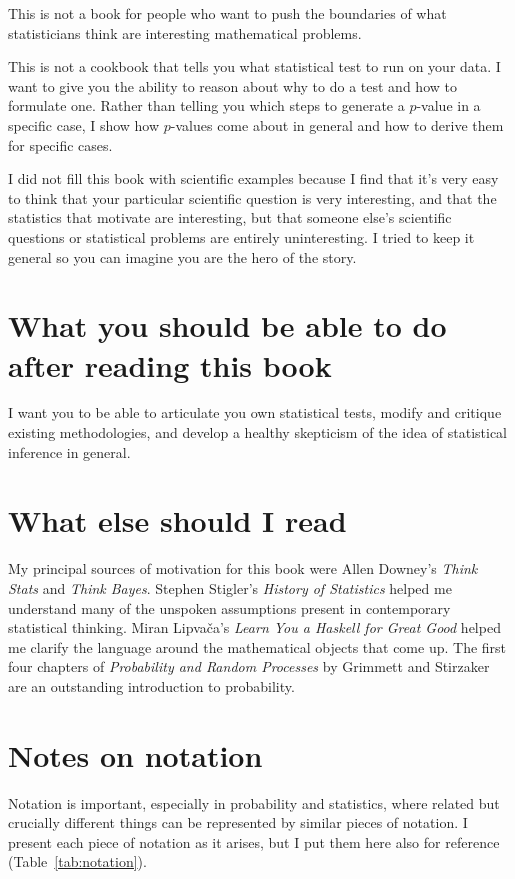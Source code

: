This is not a book for people who want to push the boundaries of what
statisticians think are interesting mathematical problems.

This is not a cookbook that tells you what statistical test to run on your
data. I want to give you the ability to reason about why to do a test and
how to formulate one. Rather than telling you which steps to generate a
$p$-value in a specific case, I show how $p$-values come about in general and
how to derive them for specific cases.

I did not fill this book with scientific examples because I find that it's
very easy to think that your particular scientific question is very
interesting, and that the statistics that motivate are interesting, but that
someone else's scientific questions or statistical problems are entirely
uninteresting. I tried to keep it general so you can imagine you are the hero of the story.

\section*{What you should be able to do after reading this book}

I want you to be able to articulate you own statistical tests, modify
and critique existing methodologies, and develop a healthy skepticism of the
idea of statistical inference in general.

\section*{What else should I read}

My principal sources of motivation for this book were Allen Downey's
\textit{Think Stats} and \textit{Think Bayes}. Stephen Stigler's
\textit{History of Statistics} helped me understand many of the unspoken
assumptions present in contemporary statistical thinking. Miran Lipva\v{c}a's
\textit{Learn You a Haskell for Great Good} helped me clarify the language
around the mathematical objects that come up. The first four chapters of
\textit{Probability and Random Processes} by Grimmett and Stirzaker are an
outstanding introduction to probability.

\section*{Notes on notation}

Notation is important, especially in probability and statistics, where related
but crucially different things can be represented by similar pieces of
notation. I present each piece of notation as it arises, but I put them here
also for reference (Table~\ref{tab:notation}).

